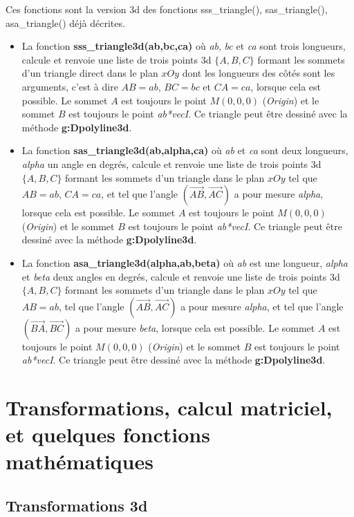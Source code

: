 Ces fonctions sont la version 3d des fonctions  sss\_triangle(), sas\_triangle(), asa\_triangle() déjà décrites.
\begin{itemize}
    \item La fonction \textbf{sss\_triangle3d(ab,bc,ca)} où \emph{ab}, \emph{bc} et \emph{ca} sont trois longueurs, calcule et renvoie une liste de trois points 3d $\{A,B,C\}$ formant les sommets d'un triangle direct dans le plan $xOy$ dont les longueurs des côtés sont les arguments, c'est à dire $AB=ab$, $BC=bc$ et $CA=ca$, lorsque cela est possible. Le sommet $A$ est toujours le point $M(0,0,0)$ (\emph{Origin}) et le sommet $B$ est toujours le point \emph{ab*vecI}. Ce triangle peut être dessiné avec la méthode \textbf{g:Dpolyline3d}.
    \item La fonction \textbf{sas\_triangle3d(ab,alpha,ca)} où \emph{ab} et \emph{ca} sont deux longueurs, \emph{alpha} un angle en degrés, calcule et renvoie une liste de trois points 3d $\{A,B,C\}$ formant les sommets d'un triangle dans le plan $xOy$ tel que $AB=ab$, $CA=ca$, et tel que l'angle $(\vec{AB},\vec{AC})$ a pour mesure \emph{alpha}, lorsque cela est possible. Le sommet $A$ est toujours le point $M(0,0,0)$ (\emph{Origin}) et le sommet $B$ est toujours le point \emph{ab*vecI}. Ce triangle peut être dessiné avec la méthode \textbf{g:Dpolyline3d}.
    \item La fonction \textbf{asa\_triangle3d(alpha,ab,beta)} où \emph{ab} est une longueur, \emph{alpha} et \emph{beta} deux angles en degrés, calcule et renvoie une liste de trois points 3d $\{A,B,C\}$ formant les sommets d'un triangle dans le plan $xOy$ tel que $AB=ab$, tel que l'angle $(\vec{AB},\vec{AC})$ a pour mesure \emph{alpha}, et tel que l'angle $(\vec{BA},\vec{BC})$ a pour mesure \emph{beta}, lorsque cela est possible. Le sommet $A$ est toujours le point $M(0,0,0)$ (\emph{Origin}) et le sommet $B$ est toujours le point \emph{ab*vecI}. Ce triangle peut être dessiné avec la méthode \textbf{g:Dpolyline3d}.
\end{itemize}

\section{Transformations, calcul matriciel, et quelques fonctions mathématiques}

\subsection{Transformations 3d}

